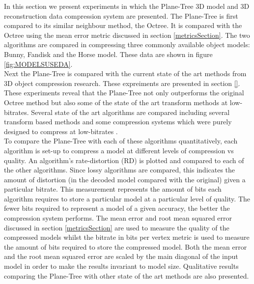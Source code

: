 
In this section we present experiments in which the Plane-Tree 3D model and 3D reconstruction data compression system are presented. The Plane-Tree is first compared to its similar neighbour method, the Octree. It is compared with the Octree using the mean error metric discussed in section \ref{metricsSection}. The two algorithms are compared in compressing three commonly available object models: Bunny, Fandisk and the Horse model. These data are shown in figure \ref{fig:MODELSUSEDA}. \\


Next the Plane-Tree is compared with the current state of the art methods from 3D object compression research. These expreiments are presented in section \ref{}. These experiments reveal that the Plane-Tree not only outperforms the original Octree method but also some of the state of the art transform methods at low-bitrates. Several state of the art algorithms are compared including several transform based methods \cite{Khodakovsky00Progressive,Bayazit103DMesh} and some compression systems which were purely designed to compress at low-bitrates \cite{Peng10Feature}. \\ 

To compare the Plane-Tree with each of these algorithms quantitatively, each algorithm is set-up to compress a model at different levels of compression vs quality. An algorithm's rate-distortion (RD) is plotted and compared to each of the other algorithms. Since lossy algorithms are compared, this indicates the amount of distortion (in the decoded model compared with the original) given a particular bitrate. This measurement represents the amount of bits each algorithm requires to store a particular model at a particular level of quality. The fewer bits required to represent a model of a given accuracy, the better the compression system performs. The mean error and root mean squared error discussed in section \ref{metricsSection} are used to measure the quality of the compressed models whilst the bitrate in bits per vertex metric is used to measure the amount of bits required to store the compressed model. Both the mean error and the root mean squared error are scaled by the main diagonal of the input model in order to make the results invariant to model size. Qualitative results comparing the Plane-Tree with other state of the art methods are also presented. \\

